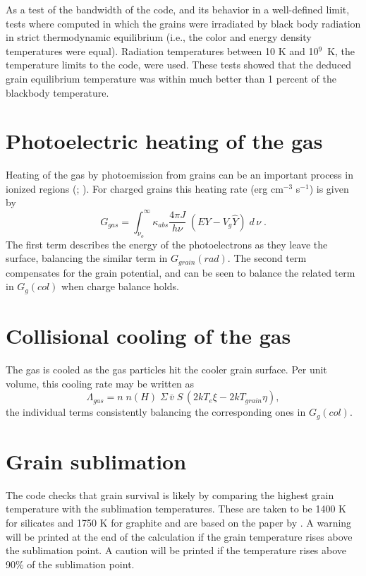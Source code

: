 As a test of the bandwidth of the code, and its behavior in a well-defined
limit, tests where computed in which the grains were irradiated by black
body radiation in strict thermodynamic equilibrium (i.e., the color and
energy density temperatures were equal).  Radiation temperatures between
10 K and 10$^9$~K, the temperature limits to the code, were used.  These tests
showed that the deduced grain equilibrium temperature was within much better
than 1 percent of the blackbody temperature.

\section{Photoelectric heating of the gas}

Heating of the gas by photoemission from grains can be an important
process in ionized regions (\citealp{Spitzer1948};
\citealp{Oliveira1986}).  For
charged grains this heating rate (erg cm$^{-3}$ s$^{-1}$) is given by
\begin{equation}
{G_{gas}} = \int_{{\nu _o}}^\infty  {{\kappa _{abs}}\frac{{4\pi J}}{{h\nu
}}\;\left( {EY - {V_g}\hat Y} \right)\;d\,\nu \;.}
\end{equation}
The first term describes the energy of the photoelectrons as they leave
the surface, balancing the similar term in $G_{grain}(rad)$.  The second term
compensates for the grain potential, and can be seen to balance the related
term in $G_g(col)$ when charge balance holds.

\section{Collisional cooling of the gas}

The gas is cooled as the gas particles hit the cooler grain surface.
Per unit volume, this cooling rate may be written as
\begin{equation}
{\Lambda _{gas}} = n\;n(H)\;\Sigma \,\bar v\;S\,\left( {2k{T_e}\xi  -
2k{T_{grain}}\eta } \right),
\end{equation}
the individual terms consistently balancing the corresponding ones in
$G_g(col)$.

\section{Grain sublimation}

The code checks that grain survival is likely by comparing the highest
grain temperature with the sublimation temperatures.  These are taken to
be 1400 K for silicates and 1750 K for graphite and are based on the paper
by \citet{Laor1993}.  A warning will be printed at the
end of the calculation if the grain temperature rises above the sublimation
point.  A caution will be printed if the temperature rises above 90\% of
the sublimation point.

